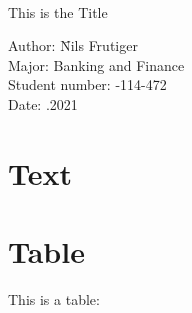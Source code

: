 \documentclass{article}
\author{
  Frutiger, Nils\\
  \texttt{abc.def@ghi.com}
  }
\begin{document}
\ \vspace{1.0cm}
\begin{center}
{\LARGE This is the Title}\\[2.5cm]



\hspace{10cm}\begin{minipage}[h]{12cm}
\begin{tabbing}
Author: \hspace{1.5cm} \= Nils Frutiger \\
Major: \> Banking and Finance  \\
Student number: -114-472 \\
Date: .2021\\
\end{tabbing}
\end{minipage}
\end{center}


\newpage

\begin{abstract}
\blindtext
\Blindtext


\end{abstract}
\newpage

\section{Text}
\blindtext
\cite{Milgrom}
\newline
\cite{DevenowRationalHerdingInFinancialEconomics}
\Blindtext

\newpage
\section{Table}

This is a table:
\end{document}
